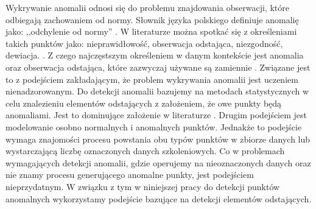Wykrywanie anomalii odnosi się do problemu znajdowania obserwacji, które odbiegają zachowaniem od normy. Słownik języka polskiego definiuje anomalię jako: ,,odchylenie od normy'' \cite{pwn}. 
W literaturze można spotkać się z określeniami takich punktów jako: nieprawidłowość, obserwacja odstająca, niezgodność, dewiacja. \cite{aggarwal2017outlier}. Z czego najczęstszym określeniem w danym kontekście jest anomalia oraz obserwacja odstająca, które zazwyczaj używane są zamiennie \cite{chandola2009anomaly}. Związane jest to z podejściem zakładającym, że problem wykrywania anomalii jest uczeniem nienadzorowanym. Do detekcji anomalii bazujemy na metodach statystycznych w celu znalezieniu elementów odstających z założeniem, że owe punkty będą anomaliami. Jest to dominujące założenie w literaturze \cite{emmott2015meta}. Drugim podejściem jest modelowanie osobno normalnych i anomalnych punktów. Jednakże to podejście wymaga znajomości procesu powstania obu typów punktów w zbiorze danych lub wystarczającą liczbę oznaczonych danych szkoleniowych. Co w problemach wymagających detekcji anomalii, gdzie operujemy na nieoznaczonych danych oraz nie znamy procesu generującego anomalne punkty, jest podejściem nieprzydatnym. W związku z tym w niniejszej pracy do detekcji punktów anomalnych wykorzystamy podejście bazujące na detekcji elementów odstających.
